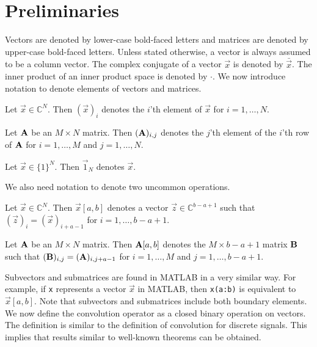 \documentclass[a4paper, openany, oneside]{memoir}
\begin{document}
\section{Preliminaries}

Vectors are denoted by lower-case bold-faced letters and matrices are denoted by upper-case bold-faced letters. Unless stated otherwise, a vector is always assumed to be a column vector. The complex conjugate of a vector $\vec{x}$ is denoted by $\bar{\vec{x}}$. The inner product of an inner product space is denoted by $\cdot$. We now introduce notation to denote elements of vectors and matrices.

\begin{blockDefinition}
    Let $\vec{x} \in \mathbb{C}^N$. Then $(\vec{x})_i$ denotes the $i$'th element of $\vec{x}$ for $i = 1,\ldots,N$.
\end{blockDefinition}

\begin{blockDefinition}
    Let $\boldsymbol{\mathbf{A}}$ be an $M \times N$ matrix. Then $(\boldsymbol{\mathbf{A}})_{i,j}$ denotes the $j$'th element of the $i$'th row of $\boldsymbol{\mathbf{A}}$ for $i = 1,\ldots,M$ and $j=1,\ldots,N$.
\end{blockDefinition}

\begin{blockDefinition}
    Let $\vec{x} \in \{1\}^N$. Then $\vec{1}_N$ denotes $\vec{x}$.
\end{blockDefinition}

We also need notation to denote two uncommon operations.

\begin{blockDefinition}[Subvector]
    Let $\vec{x} \in \mathbb{C}^N$. Then $\vec{x}[a,b]$ denotes a vector $\vec{z} \in \mathbb{C}^{b-a+1}$ such that $(\vec{z})_i = (\vec{x})_{i+a-1}$ for $i = 1,\ldots,b-a+1$.
\end{blockDefinition}

\begin{blockDefinition}[Submatrix]
    Let $\boldsymbol{\mathbf{A}}$ be an $M \times N$ matrix. Then $\boldsymbol{\mathbf{A}}[a,b]$ denotes the $M \times b-a+1$ matrix $\boldsymbol{\mathbf{B}}$ such that $(\boldsymbol{\mathbf{B}})_{i,j}=(\boldsymbol{\mathbf{A}})_{i,j+a-1}$ for $i = 1,\ldots,M$ and $j = 1,\ldots,b-a+1$.
\end{blockDefinition}

Subvectors and submatrices are found in MATLAB in a very similar way. For example, if \texttt{x} represents a vector $\vec{x}$ in MATLAB, then \texttt{x(a:b)} is equivalent to $\vec{x}[a,b]$. Note that subvectors and submatrices include both boundary elements.
We now define the convolution operator as a closed binary operation on vectors. The definition is similar to the definition of convolution for discrete signals. This implies that results similar to well-known theorems can be obtained.
\end{document}
